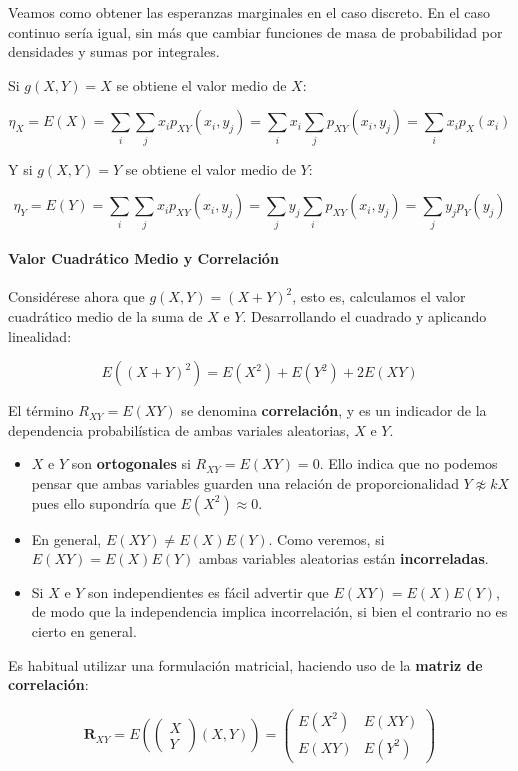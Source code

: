 \documentclass[11pt]{article}
\providecommand{\tightlist}{%
      \setlength{\itemsep}{0pt}\setlength{\parskip}{0pt}}
\begin{document}
    Veamos como obtener las esperanzas marginales en el caso discreto. En el
caso continuo sería igual, sin más que cambiar funciones de masa de
probabilidad por densidades y sumas por integrales.

Si \(g(X,Y)=X\) se obtiene el valor medio de \(X\):

\[\eta_X=E(X)=\sum_i\sum_j x_i p_{XY}(x_i,y_j)=\sum_i x_i \sum_j p_{XY}(x_i,y_j) = \sum_i x_i p_X(x_i)\]

Y si \(g(X,Y)=Y\) se obtiene el valor medio de \(Y\):

\[\eta_Y=E(Y)=\sum_i\sum_j x_i p_{XY}(x_i,y_j)=\sum_j y_j \sum_i p_{XY}(x_i,y_j) = \sum_j y_j p_Y(y_j)\]

    \hypertarget{valor-cuadruxe1tico-medio-y-correlaciuxf3n}{%
\paragraph{Valor Cuadrático Medio y
Correlación}\label{valor-cuadruxe1tico-medio-y-correlaciuxf3n}}

Considérese ahora que \(g(X,Y)=(X+Y)^2\), esto es, calculamos el valor
cuadrático medio de la suma de \(X\) e \(Y\). Desarrollando el cuadrado
y aplicando linealidad:

\[E((X+Y)^2)= E(X^2)+E(Y^2)+2E(XY)\]

El término \(R_{XY}=E(XY)\) se denomina \textbf{correlación}, y es un
indicador de la dependencia probabilística de ambas variales aleatorias,
\(X\) e \(Y\).

\begin{itemize}
\tightlist
\item
  \(X\) e \(Y\) son \textbf{ortogonales} si \(R_{XY}=E(XY)=0\). Ello
  indica que no podemos pensar que ambas variables guarden una relación
  de proporcionalidad \(Y \not \approx kX\) pues ello supondría que
  \(E(X^2) \approx 0\).
\item
  En general, \(E(XY) \neq E(X)E(Y)\). Como veremos, si
  \(E(XY)=E(X)E(Y)\) ambas variables aleatorias están
  \textbf{incorreladas}.
\item
  Si \(X\) e \(Y\) son independientes es fácil advertir que
  \(E(XY)=E(X)E(Y)\), de modo que la independencia implica
  incorrelación, si bien el contrario no es cierto en general.
\end{itemize}

    Es habitual utilizar una formulación matricial, haciendo uso de la
\textbf{matriz de correlación}:

\[\mathbf R_{XY} = E(\begin{pmatrix} X\\Y\end{pmatrix} (X, Y))= 
\begin{pmatrix}
E(X^2) & E(XY)\\
E(XY) & E(Y^2)
\end{pmatrix}\]
\end{document}
